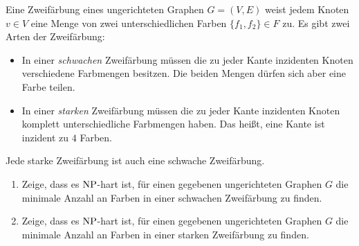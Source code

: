 \documentclass{uebung_cs}
\begin{document}
\begin{aufgabe}[Zweifärbung]
	Eine Zweifärbung eines ungerichteten Graphen $G = (V,E)$ weist jedem Knoten $v \in V$ eine Menge von zwei unterschiedlichen Farben $\{f_1,f_2\} \in F$ zu. Es gibt zwei Arten der Zweifärbung:
	\begin{itemize}
		\item In einer \textit{schwachen} Zweifärbung müssen die zu jeder Kante inzidenten Knoten verschiedene Farbmengen besitzen. Die beiden Mengen dürfen sich aber eine Farbe teilen.
		\item In einer \textit{starken} Zweifärbung müssen die zu jeder Kante inzidenten Knoten komplett unterschiedliche Farbmengen haben. Das heißt, eine Kante ist inzident zu $4$ Farben.
	\end{itemize}
	Jede starke Zweifärbung ist auch eine schwache Zweifärbung.
	\begin{enumerate}
		\item Zeige, dass es $\mathrm{NP}$-hart ist, für einen gegebenen ungerichteten Graphen $G$ die minimale Anzahl an Farben in einer schwachen Zweifärbung zu finden.
		\item Zeige, dass es $\mathrm{NP}$-hart ist, für einen gegebenen ungerichteten Graphen $G$ die minimale Anzahl an Farben in einer starken Zweifärbung zu finden.
	\end{enumerate}
\end{aufgabe}

\end{document}
